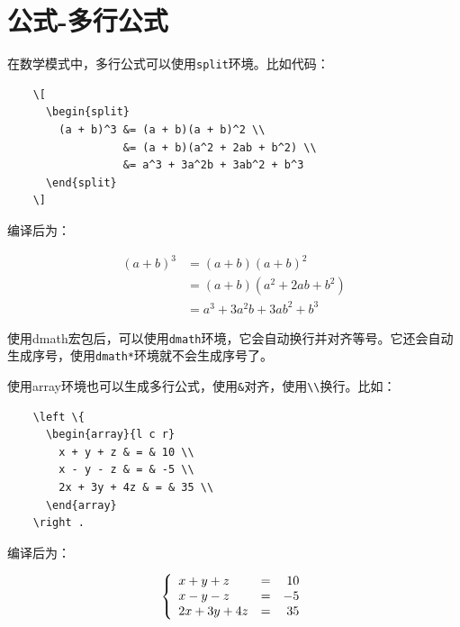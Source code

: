\documentclass[12pt,a4paper]{ctexart}
\begin{document}
\section{公式-多行公式}
在数学模式中，多行公式可以使用\verb|split|环境。比如代码：
\begin{center}
  \begin{verbatim}
    \[
      \begin{split}
        (a + b)^3 &= (a + b)(a + b)^2 \\
                  &= (a + b)(a^2 + 2ab + b^2) \\
                  &= a^3 + 3a^2b + 3ab^2 + b^3
      \end{split}
    \]
  \end{verbatim}
\end{center}
编译后为： 
\begin{center}
  \[
    \begin{split}
      (a + b)^3 &= (a + b)(a + b)^2 \\
                &= (a + b)(a^2 + 2ab + b^2) \\
                &= a^3 + 3a^2b + 3ab^2 + b^3
    \end{split}
  \]
\end{center}

\vspace*{\baselineskip}

使用dmath宏包后，可以使用\verb|dmath|环境，它会自动换行并对齐等号。它还会自动生成序号，使用\verb|dmath*|环境就不会生成序号了。

\vspace*{\baselineskip}

使用array环境也可以生成多行公式，使用\verb|&|对齐，使用\verb|\\|换行。比如：
\begin{center}
  \begin{verbatim}
    \left \{
      \begin{array}{l c r}
        x + y + z & = & 10 \\
        x - y - z & = & -5 \\
        2x + 3y + 4z & = & 35 \\
      \end{array} 
    \right .
  \end{verbatim}
\end{center}
编译后为：
\begin{center}
  \[
    \left \{
      \begin{array}{l c r}
        x + y + z & = & 10 \\
        x - y - z & = & -5 \\
        2x + 3y + 4z & = & 35 \\
      \end{array}
    \right .
  \]
\end{center}
\end{document}
